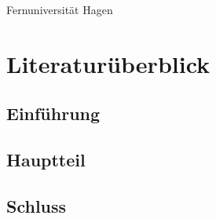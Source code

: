\documentclass[12pt,ngerman]{scrreport}
\begin{document}
\begin{titlepage}
Fernuniversität Hagen

\end{titlepage}


\tableofcontents

\chapter{Literaturüberblick}
\section{Einführung}

\blindtext

\section{Hauptteil}

\blindtext

\section{Schluss}

\blindtext
\end{document}
